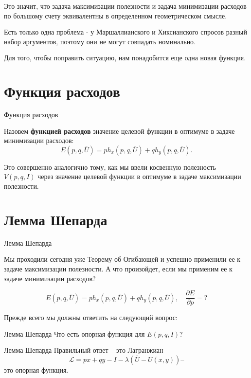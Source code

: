 \documentclass{beamer}
\begin{document}
\begin{frame}
Это значит, что задача максимизации полезности и задача минимизации расходов по большому счету эквивалентны в определенном геометрическом смысле. 

Есть только одна проблема - у Маршаллианского и Хиксианского спросов разный набор аргументов, поэтому они не могут совпадать номинально. 

Для того, чтобы поправить ситуацию, нам понадобится еще одна новая функция.
\end{frame}

\section{Функция расходов}

\begin{frame}{Функция расходов}

\begin{definition}
Назовем \textbf{функцией расходов} значение целевой функции в оптимуме в задаче минимизации расходов:
$$ E(p,q,\bar U) = p h_x(p,q,\bar U) + q h_y(p,q,\bar U).$$
\end{definition}

Это совершенно аналогично тому, как мы ввели косвенную полезность $V(p,q,I)$ через значение целевой функции в оптимуме в задаче максимизации полезности.
\end{frame}

\section{Лемма Шепарда}

\begin{frame}{Лемма Шепарда}

Мы проходили сегодня уже Теорему об Огибающей и успешно применили ее к задаче максимизации полезности. А что произойдет, если мы применим ее к задаче минимизации расходов?

$$ E(p,q,\bar U) = p h_x(p,q,\bar U) + q h_y(p,q,\bar U), \quad \frac{\partial E}{\partial p} = ?$$

Прежде всего мы должны ответить на следующий вопрос:
\end{frame}

\begin{frame}{Лемма Шепарда}
Что есть опорная функция для $E(p,q,I)$?
\end{frame}

\begin{frame}{Лемма Шепарда}
Правильный ответ – это Лагранжиан 
$$\mathcal{L}=px + qy - I - \lambda(\bar U - U(x,y)) – $$
это опорная функция.
\end{frame}
\end{document}
